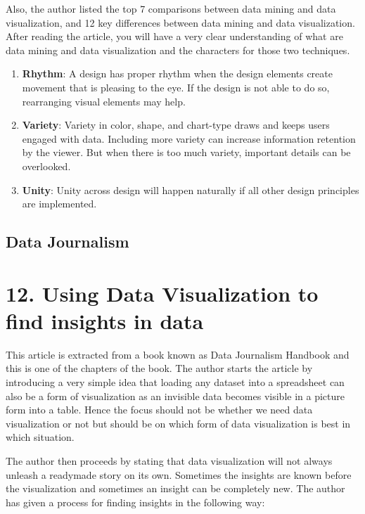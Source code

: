 \documentclass[]{book}
\theoremstyle{definition}
\theoremstyle{definition}
\theoremstyle{definition}
\theoremstyle{remark}
\begin{document}
Also, the author listed the top 7 comparisons between data mining and
data visualization, and 12 key differences between data mining and data
visualization. After reading the article, you will have a very clear
understanding of what are data mining and data visualization and the
characters for those two techniques.

\begin{enumerate}
\def\labelenumi{\arabic{enumi}.}
\setcounter{enumi}{6}
\item
  \textbf{Rhythm}: A design has proper rhythm when the design elements
  create movement that is pleasing to the eye. If the design is not able
  to do so, rearranging visual elements may help.
\item
  \textbf{Variety}: Variety in color, shape, and chart-type draws and
  keeps users engaged with data. Including more variety can increase
  information retention by the viewer. But when there is too much
  variety, important details can be overlooked.
\item
  \textbf{Unity}: Unity across design will happen naturally if all other
  design principles are implemented.
\end{enumerate}

\subsection{Data Journalism}\label{data-journalism}

\section{12. Using Data Visualization to find insights in
data}\label{using-data-visualization-to-find-insights-in-data-1}

This article is extracted from a book known as Data Journalism Handbook
and this is one of the chapters of the book. The author starts the
article by introducing a very simple idea that loading any dataset into
a spreadsheet can also be a form of visualization as an invisible data
becomes visible in a picture form into a table. Hence the focus should
not be whether we need data visualization or not but should be on which
form of data visualization is best in which situation.

The author then proceeds by stating that data visualization will not
always unleash a readymade story on its own. Sometimes the insights are
known before the visualization and sometimes an insight can be
completely new. The author has given a process for finding insights in
the following way:
\end{document}
